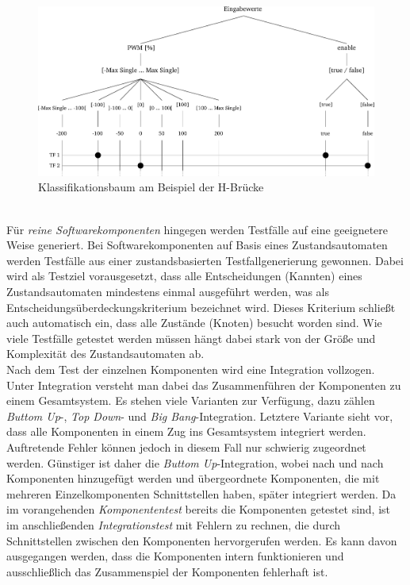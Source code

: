 \begin{figure}%
\includegraphics[width=\columnwidth]{./Bilder/fig_klass}%
\caption{Klassifikationsbaum am Beispiel der H-Brücke}%
\label{fig_klass}%
\end{figure}
\\
Für \textit{reine Softwarekomponenten} hingegen werden Testfälle auf eine geeignetere Weise generiert. Bei Softwarekomponenten auf Basis eines Zustandsautomaten werden Testfälle aus einer zustandsbasierten Testfallgenerierung gewonnen. Dabei wird als Testziel vorausgesetzt, dass alle Entscheidungen (Kannten) eines Zustandsautomaten mindestens einmal ausgeführt werden, was als Entscheidungsüberdeckungskriterium bezeichnet wird. Dieses Kriterium schließt auch automatisch ein, dass alle Zustände (Knoten) besucht worden sind. Wie viele Testfälle getestet werden müssen hängt dabei stark von der Größe und Komplexität des Zustandsautomaten ab.\\
Nach dem Test der einzelnen Komponenten wird eine Integration vollzogen. Unter Integration versteht man dabei das Zusammenführen der Komponenten zu einem Gesamtsystem. Es stehen viele Varianten zur Verfügung, dazu zählen \textit{Buttom Up}-, \textit{Top Down}- und \textit{Big Bang}-Integration. Letztere Variante sieht vor, dass alle Komponenten in einem Zug ins Gesamtsystem integriert werden. Auftretende Fehler können jedoch in diesem Fall nur schwierig zugeordnet werden. Günstiger ist daher die \textit{Buttom Up}-Integration, wobei nach und nach Komponenten hinzugefügt werden und übergeordnete Komponenten, die mit mehreren Einzelkomponenten Schnittstellen haben, später integriert werden. Da im vorangehenden \textit{Komponententest} bereits die Komponenten getestet sind, ist im anschließenden \textit{Integrationstest} mit Fehlern zu rechnen, die durch Schnittstellen zwischen den Komponenten hervorgerufen werden. Es kann davon ausgegangen werden, dass die Komponenten intern funktionieren und ausschließlich das Zusammenspiel der Komponenten fehlerhaft ist. \\
